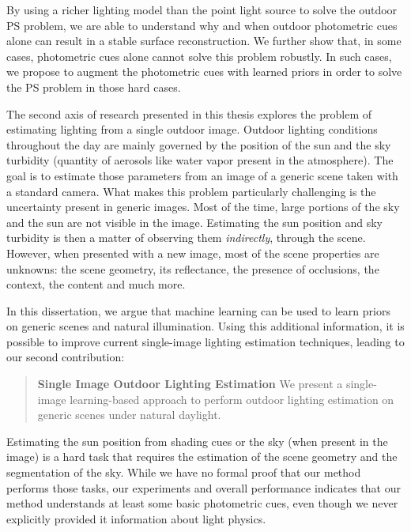 By using a richer lighting model than the point light source to solve the outdoor PS problem, we are able to understand why and when outdoor photometric cues alone can result in a stable surface reconstruction. We further show that, in some cases, photometric cues alone cannot solve this problem robustly. In such cases, we propose to augment the photometric cues with learned priors in order to solve the PS problem in those hard cases. 

The second axis of research presented in this thesis explores the problem of estimating lighting from a single outdoor image. Outdoor lighting conditions throughout the day are mainly governed by the position of the sun and the sky turbidity (quantity of aerosols like water vapor present in the atmosphere). The goal is to estimate those parameters from an image of a generic scene taken with a standard camera. What makes this problem particularly challenging is the uncertainty present in generic images. Most of the time, large portions of the sky and the sun are not visible in the image. Estimating the sun position and sky turbidity is then a matter of observing them \emph{indirectly}, through the scene. However, when presented with a new image, most of the scene properties are unknowns: the scene geometry, its reflectance, the presence of occlusions, the context, the content and much more. 

In this dissertation, we argue that machine learning can be used to learn priors on generic scenes and natural illumination. Using this additional information, it is possible to improve current single-image lighting estimation techniques, leading to our second contribution: 

\begin{quotation}
\textbf{Single Image Outdoor Lighting Estimation} We present a single-image learning-based approach to perform outdoor lighting estimation on generic scenes under natural daylight. 
\end{quotation}

Estimating the sun position from shading cues or the sky (when present in the image) is a hard task that requires the estimation of the scene geometry and the segmentation of the sky. While we have no formal proof that our method performs those tasks, our experiments and overall performance indicates that our method understands at least some basic photometric cues, even though we never explicitly provided it information about light physics.


